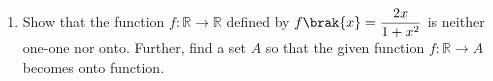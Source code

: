 \begin{enumerate}[label=\thesubsection.\arabic*, ref=\thesubsection.\theenumi]
\begin{align}
\int\frac{t^2}{\sqrt{1-t^2}}\,dt
=\frac{1}{2}\sin^{-1}t
-\frac{t\sqrt{1-t^2}}{2}+C.
\end{align}
Therefore,
\begin{align}
\int\frac{x^{7/2}}{\sqrt{1-x^3}}\,dx
=\frac{1}{3}\sin^{-1}\brak{x^{3/2}}
-\frac{x^{3/2}\sqrt{1-x^3}}{3}+C.
\end{align}
Substituting into the expression for $I$,
\begin{align}
I={}&\frac{x^3}{3}\sin^{-1}\brak{x^{3/2}}\\
&-\frac{1}{6}\sin^{-1}\brak{x^{3/2}}\\
&+\frac{x^{3/2}\sqrt{1-x^3}}{6}+C.
\end{align}
Hence, the final answer is
\begin{align}
I={}&\frac{x^3}{3}\sin^{-1}\brak{x^{3/2}}
-\frac{1}{6}\sin^{-1}\brak{x^{3/2}}\\
&+\frac{x^{3/2}\sqrt{1-x^3}}{6}+C.
\end{align}

\item
Show that the function $f:\mathbb{R}\to\mathbb{R}$ defined by $f\brak{x}=\dfrac{2x}{1+x^2}$
is neither one-one nor onto. Further, find a set $A$ so that the given function
$f:\mathbb{R}\to A$ becomes onto function.


\end{enumerate}

